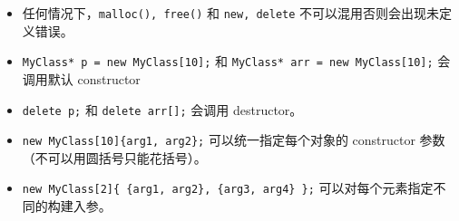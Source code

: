 
\begin{itemize}
\item 任何情况下，\verb`malloc(), free()` 和 \verb`new, delete` 不可以混用否则会出现未定义错误。
\item \verb`MyClass* p = new MyClass[10];` 和 \verb`MyClass* arr = new MyClass[10];` 会调用默认 constructor
\item \verb`delete p;` 和 \verb`delete arr[];` 会调用 destructor。
\item \verb`new MyClass[10]{arg1, arg2};` 可以统一指定每个对象的 constructor 参数（不可以用圆括号只能花括号）。
\item \verb`new MyClass[2]{ {arg1, arg2}, {arg3, arg4} };` 可以对每个元素指定不同的构建入参。
\end{itemize}
